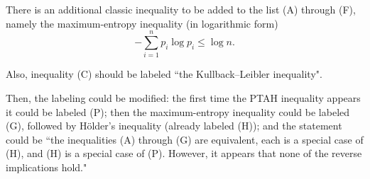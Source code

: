 \documentclass[12pt]{article}
\begin{document}
There is an additional classic inequality to be added to the list (A) through (F), namely the maximum-entropy inequality (in logarithmic form)
\[   - \sum_{i=1}^n p_i \log p_i \le \log n . \]

Also, inequality (C) should be labeled ``the Kullback--Leibler inequality".

Then, the labeling could be modified: the first time the PTAH inequality appears it could be labeled (P);
then the maximum-entropy inequality could be labeled (G), followed by H\"{o}lder's inequality (already labeled (H));
and the statement could be ``the inequalities (A) through (G) are equivalent, each is a special case of (H), 
and (H) is a special case of (P).  However, it appears that none of the reverse implications hold."
\end{document}
